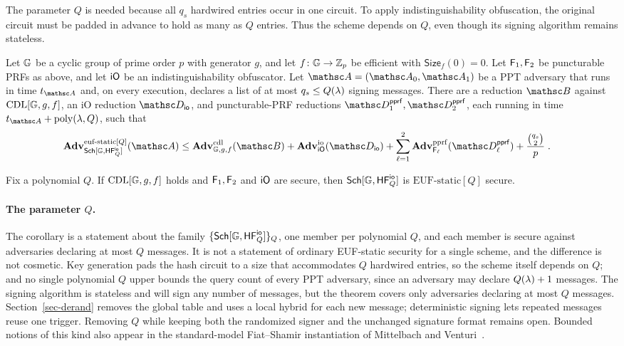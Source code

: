 The parameter $Q$ is needed because all $q_s$ hardwired entries occur in one circuit. To apply indistinguishability obfuscation, the original circuit must be padded in advance to hold as many as $Q$ entries. Thus the scheme depends on $Q$, even though its signing algorithm remains stateless.

\begin{theorem} \label{thm-uf}
Let $\mathbb{G}$ be a cyclic group of prime order $p$ with generator $g$, and let $f \colon \mathbb{G} \to \mathbb Z_p$ be efficient with $\mathsf{Size}_f(0) = 0$. Let $\mathsf{F}_1, \mathsf{F}_2$ be puncturable PRFs as above, and let $\mathsf{iO}$ be an indistinguishability obfuscator. Let $\advA = (\advA_0, \advA_1)$ be a PPT adversary that runs in time $t_{\advA}$ and, on every execution, declares a list of at most $q_s\le Q(\lambda)$ signing messages. There are a reduction $\advB$ against $\text{CDL}[\mathbb{G},g,f]$, an iO reduction $\advD_{\mathsf{io}}$, and puncturable-PRF reductions $\advD^{\mathsf{pprf}}_1,\advD^{\mathsf{pprf}}_2$, each running in time $t_{\advA} + \poly(\secp, Q)$, such that
\begin{align*}
\AdvEUFSTATICQ{\SchScheme[\GG, \HF^{\mathsf{io}}_Q]}{\advA}
\le{}& \AdvCDL{\GG,g,f}{\advB}
+ \AdvIO{\iO}{\advD_{\mathsf{io}}}
+ \sum_{\ell=1}^{2}\AdvPPRF{\PRF_\ell}{\advD^{\mathsf{pprf}}_\ell}
+ \frac{\binom{q_s}{2}}{p} \;.
\end{align*}
\end{theorem}

\begin{corollary} \label{cor-uf}
Fix a polynomial $Q$. If $\text{CDL}[\mathbb{G},g,f]$ holds and $\mathsf{F}_1,\mathsf{F}_2$ and $\mathsf{iO}$ are secure, then $\mathsf{Sch}[\mathbb{G}, \mathsf{HF}^{\mathsf{io}}_Q]$ is $\mathrm{EUF\text{-}static}[Q]$ secure.
\end{corollary}

\paragraph*{The parameter $Q$.} The corollary is a statement about the family $\{\mathsf{Sch}[\mathbb{G},\mathsf{HF}^{\mathsf{io}}_Q]\}_Q$, one member per polynomial $Q$, and each member is secure against adversaries declaring at most $Q$ messages. It is not a statement of ordinary EUF-static security for a single scheme, and the difference is not cosmetic. Key generation pads the hash circuit to a size that accommodates $Q$ hardwired entries, so the scheme itself depends on $Q$; and no single polynomial $Q$ upper bounds the query count of every PPT adversary, since an adversary may declare $Q(\lambda)+1$ messages. The signing algorithm is stateless and will sign any number of messages, but the theorem covers only adversaries declaring at most $Q$ messages. Section~\ref{sec-derand} removes the global table and uses a local hybrid for each new message; deterministic signing lets repeated messages reuse one trigger. Removing $Q$ while keeping both the randomized signer and the unchanged signature format remains open. Bounded notions of this kind also appear in the standard-model Fiat--Shamir instantiation of Mittelbach and Venturi~\cite{DBLP:journals/tcs/MittelbachV18}.

